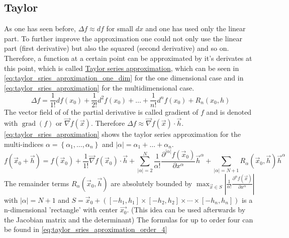 \subsection{Taylor}
As one has seen before, $\Delta f \approx df$ for small $dx$ and one has used only the linear part. To further improve the approximation one could not only use the linear part (first derivative) but also the squared (second derivative) and so on. Therefore, a function at a certain point can be approximated by it's derivates at this point, which is called \href{https://en.wikipedia.org/wiki/Taylor_series}{Taylor series approximation}, which can be seen in \autoref{eq:taylor_sries_aproximation_one_dim} for the one dimensional case and in \autoref{eq:taylor_sries_aproximation} for the multidimensional case.
\begin{equation}\label{eq:taylor_sries_aproximation_one_dim}
\Delta f=\frac{1}{1 !} d f\left(x_{0}\right)+\frac{1}{2 !} d^{2} f\left(x_{0}\right)+\ldots+\frac{1}{n !} d^{n} f\left(x_{0}\right)+R_{n}\left(x_{0}, h\right)
\end{equation}
The vector field of of the partial derivative is called gradient of $f$ and is denoted with $\operatorname{grad}(f)$ or $\vec{\nabla} f(\vec{x})$. Therefore $\Delta f \approx \vec{\nabla} f(\vec{x}) \cdot \vec{h}$. \autoref{eq:taylor_sries_aproximation} shows the taylor series approximation for the multi-indices  $\alpha=\left\{\alpha_{1}, \ldots, \alpha_{n}\right\}$ and $|\alpha|=\alpha_{1}+\ldots+\alpha_{n}$.
\begin{equation}\label{eq:taylor_sries_aproximation}
f\left(\vec{x}_0+\vec{h}\right)=f\left(\vec{x}_0\right)+\frac{1}{1 !} \vec{\nabla} f\left(\vec{x}_0\right) \cdot \vec{h}+\sum_{|\alpha|=2}^N \frac{1}{\alpha !} \frac{\partial^{|\alpha|} f\left(\vec{x}_0\right)}{\partial x^\alpha} \vec{h}^\alpha+\sum_{|\alpha|=N+1} R_\alpha\left(\vec{x}_0, \vec{h}\right) \vec{h}^\alpha
\end{equation}
The remainder terms $R_\alpha\left(\vec{x}_0, \vec{h}\right)$ are absolutely bounded by $\max _{\vec{x} \in S}\left|\frac{1}{\alpha !} \frac{\partial^\alpha f(\vec{x})}{\partial x^\alpha}\right|$ with $|\alpha|=N+1$ and
 $S=\vec{x}_0+\left(\left[-h_1, h_1\right] \times\left[-h_2, h_2\right] \times \cdots \times\left[-h_n, h_n\right]\right)$ is a n-dimensional 'rectangle' with center $\vec{x_0}$. (This idea can be used afterwards by the Jacobian matrix and the determinant) \newline
The formulas for up to order four can be found in \autoref{eq:taylor_sries_aproximation_order_4}
